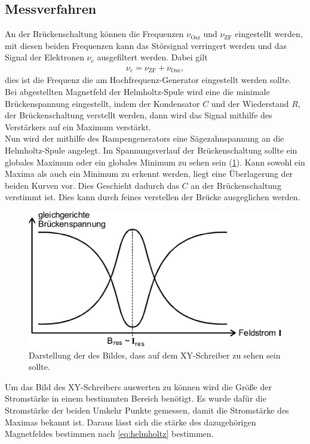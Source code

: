 \subsection{Messverfahren}
An der Brückenschaltung können die Frequenzen $\nu_\text{Osz}$ und $\nu_\text{ZF}$ eingestellt werden, mit diesen beiden Frequenzen kann das Störsignal verringert werden und das Signal der Elektronen $\nu_e$ ausgefiltert werden. Dabei gilt
\begin{align}
	\nu_e=\nu_\text{ZF}+\nu_\text{Osz},
\end{align}
dies ist die Frequenz die am Hochfrequenz-Generator eingestellt werden sollte. Bei abgestellten Magnetfeld der Helmholtz-Spule wird eine die minimale Brückenspannung eingestellt, indem der Kondensator $C$ und der Wiederstand $R$, der Brückenschaltung verstellt werden, dann wird das Signal mithilfe des Verstärkers auf ein Maximum verstärkt.\\
Nun wird der mithilfe des Rampengenerators eine Sägezahnspannung an die Helmholtz-Spule angelegt. Im Spannungsverlauf der Brückenschaltung sollte ein globales Maximum oder ein globales Minimum zu sehen sein (\cref{fig:Resonanz}). 
Kann sowohl ein Maxima als auch ein Minimum zu erkennt werden, liegt eine Überlagerung der beiden Kurven vor. Dies Geschieht dadurch das $C$ an der Brückenschaltung verstimmt ist.  Dies kann durch feines verstellen der Brücke ausgeglichen werden.
\begin{figure}[h!]
\centering
\includegraphics[width=\textwidth]{../Grafiken/Resonanz.pdf}
\caption{Darstellung der des Bildes, dass auf dem XY-Schreiber zu sehen sein sollte.\cite{V28}}\label{fig:Resonanz}
\end{figure}
Um das Bild des XY-Schreibers auswerten zu können wird die Größe der Stromstärke in einem bestimmten Bereich benötigt. Es wurde dafür die Stromstärke der beiden Umkehr Punkte gemessen, damit die Stromstärke des Maximas bekannt ist. Daraus lässt sich die stärke des dazugehörigen Magnetfeldes bestimmen nach \eqref{eq:helmholtz} bestimmen.